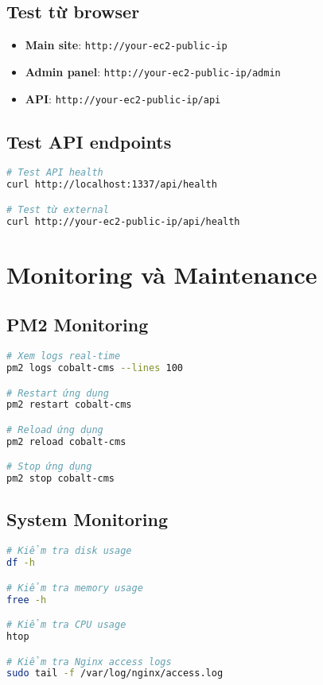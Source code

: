 \documentclass[12pt,a4paper]{article}
\begin{document}
\subsection{Test từ browser}
\begin{itemize}
    \item \textbf{Main site}: \texttt{http://your-ec2-public-ip}
    \item \textbf{Admin panel}: \texttt{http://your-ec2-public-ip/admin}
    \item \textbf{API}: \texttt{http://your-ec2-public-ip/api}
\end{itemize}

\subsection{Test API endpoints}
\begin{lstlisting}[language=bash]
# Test API health
curl http://localhost:1337/api/health

# Test từ external
curl http://your-ec2-public-ip/api/health
\end{lstlisting}

\section{Monitoring và Maintenance}

\subsection{PM2 Monitoring}
\begin{lstlisting}[language=bash]
# Xem logs real-time
pm2 logs cobalt-cms --lines 100

# Restart ứng dụng
pm2 restart cobalt-cms

# Reload ứng dụng
pm2 reload cobalt-cms

# Stop ứng dụng
pm2 stop cobalt-cms
\end{lstlisting}

\subsection{System Monitoring}
\begin{lstlisting}[language=bash]
# Kiểm tra disk usage
df -h

# Kiểm tra memory usage
free -h

# Kiểm tra CPU usage
htop

# Kiểm tra Nginx access logs
sudo tail -f /var/log/nginx/access.log
\end{lstlisting}
\end{document}
